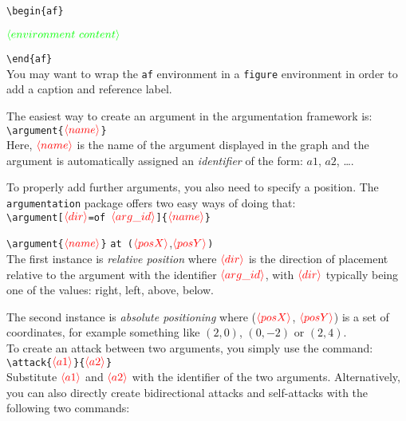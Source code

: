 \documentclass[headings=normal]{scrartcl}
\newcommand{\argumentation}{\texttt{argumentation}\xspace}
\newcommand{\opt}[2][red]{\ensuremath{\textcolor{#1}{\langle #2\rangle}}}
\begin{document}
\vspace{-0.3cm}
\verb|\begin{af}|

\quad\opt[green]{environment~content}

\verb|\end{af}|\\

\noindent
You may want to wrap the \texttt{af} environment in a \texttt{figure} environment in order to add a caption and reference label.

The easiest way to create an argument in the argumentation framework is:\\

\vspace{-0.3cm}
\verb|\argument{|\opt{name}\verb|}|\\

\noindent
Here, \opt{name} is the name of the argument displayed in the graph and the argument is automatically assigned an \emph{identifier} of the form: $a1$, $a2$, \dots.

To properly add further arguments, you also need to specify a position.
The \argumentation package offers two easy ways of doing that:\\

\vspace{-0.3cm}
\verb|\argument[|\opt{dir}\verb|=of |\opt{arg\_id}\verb|]{|\opt{name}\verb|}|

\verb|\argument{|\opt{name}\verb|}| \verb|at (|\opt{posX},\opt{posY}\verb|)|\\

\noindent
The first instance is \emph{relative position} where \opt{dir} is the direction of placement relative to the argument with the identifier \opt{arg\_id}, with \opt{dir} typically being one of the values: \textsf{right}, \textsf{left}, \textsf{above}, \textsf{below}.

The second instance is \emph{absolute positioning} where (\opt{posX}, \opt{posY}) is a set of coordinates, for example something like $(2, 0)$, $(0, -2)$ or $(2, 4)$.\\

\noindent
To create an attack between two arguments, you simply use the command:\\

\vspace{-0.3cm}
\verb|\attack{|\opt{a1}\verb|}{|\opt{a2}\verb|}|\\

\noindent
Substitute \opt{a1} and \opt{a2} with the identifier of the two arguments.
Alternatively, you can also directly create bidirectional attacks and self-attacks with the following two commands:\\
\end{document}

